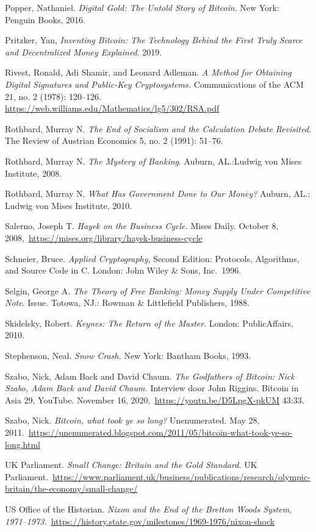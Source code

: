 \documentclass[
  a5paper,
  smalldemyvopaper,11pt,twoside,onecolumn,openright,extrafontsizes,
hidelinks]{memoir}
\begin{document}
{Popper, Nathaniel. \emph{Digital Gold: The Untold Story of Bitcoin}. New
York: Penguin Books, 2016.

Pritzker, Yan, \emph{Inventing Bitcoin: The Technology Behind the First
Truly Scarce and Decentralized Money Explained}. 2019.

Rivest, Ronald, Adi Shamir, and Leonard Adleman. \emph{A Method for
Obtaining Digital Signatures and Public-Key Cryptosystems.}
Communications of the ACM 21, no. 2 (1978): 120--126.
\url{https://web.williams.edu/Mathematics/lg5/302/RSA.pdf}

Rothbard, Murray N. \emph{The End of Socialism and the Calculation
Debate Revisited.} The Review of Austrian Economics 5, no. 2 (1991):
51--76.

Rothbard, Murray N. \emph{The Mystery of Banking}. Auburn, AL.:Ludwig
von Mises Institute, 2008.

Rothbard, Murray N. \emph{What Has Government Done to Our Money?}
Auburn, AL.: Ludwig von Mises Institute, 2010.

Salerno, Joseph T. \emph{Hayek on the Business Cycle.} Mises Daily.
October 8, 2008,~\url{https://mises.org/library/hayek-business-cycle}

Schneier, Bruce. \emph{Applied Cryptography}, Second Edition: Protocols,
Algorithms, and Source Code in C. London: John Wiley \& Sons, Inc.~1996.

Selgin, George A. \emph{The Theory of Free Banking: Money Supply Under
Competitive Note}. Issue. Totowa, NJ.: Rowman \& Littlefield Publishers,
1988.

Skidelsky, Robert. \emph{Keynes: The Return of the Master}. London:
PublicAffairs, 2010.

Stephenson, Neal. \emph{Snow Crash.} New York: Bantham Books, 1993.

Szabo, Nick, Adam Back and David Chaum. \emph{The Godfathers of Bitcoin:
Nick Szabo, Adam Back and David Chaum.} Interview door John Riggins.
Bitcoin in Asia 29, YouTube. November 16,
2020,~\url{https://youtu.be/D5LpgX-pkUM} 43:33.

Szabo, Nick. \emph{Bitcoin, what took ye so long?} Unenumerated. May 28,
2011.~\url{https://unenumerated.blogspot.com/2011/05/bitcoin-what-took-ye-so-long.html}

UK Parliament. \emph{Small Change: Britain and the Gold Standard.} UK
Parliament.~\url{https://www.parliament.uk/business/publications/research/olympic-britain/the-economy/small-change/}

US Office of the Historian. \emph{Nixon and the End of the Bretton Woods
System,
1971--1973.}~\url{https://history.state.gov/milestones/1969-1976/nixon-shock}

}
\end{document}
